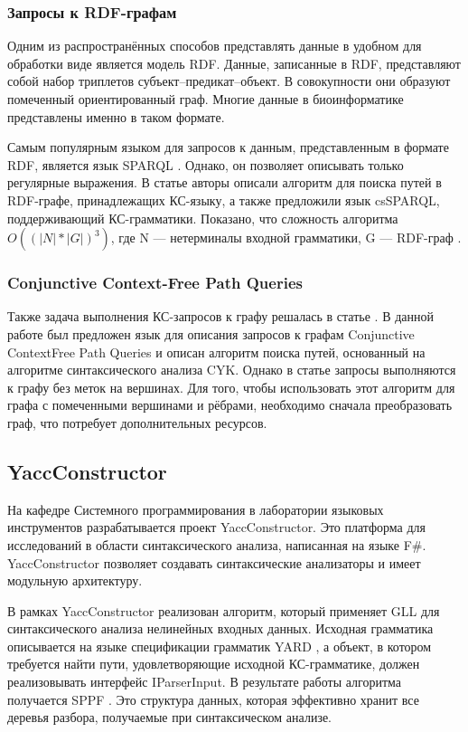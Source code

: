 \documentclass[14pt]{matmex-diploma}
\begin{document}
\subsubsection{Запросы к RDF-графам}
Одним из распространённых способов представлять данные в удобном для обработки виде является модель RDF. Данные, записанные в RDF, представляют собой набор триплетов субъект--предикат--объект. В совокупности они образуют помеченный ориентированный граф. Многие данные в биоинформатике представлены именно в таком формате.

Самым популярным языком для запросов к данным, представленным в формате RDF, является язык SPARQL \cite{prud2008sparql}. Однако, он позволяет описывать только регулярные выражения. В статье \cite{zhang2016context} авторы описали алгоритм для поиска путей в RDF-графе, принадлежащих КС-языку, а также предложили язык csSPARQL, поддерживающий КС-грамматики. Показано, что сложность алгоритма $O((|N|*|G|)^3)$, где N --- нетерминалы входной грамматики, G --- RDF-граф \cite{zhang2016context}.

\subsubsection{Conjunctive Context-Free Path Queries}
Также задача выполнения КС-запросов к графу решалась в статье \cite{hellings2014conjunctive}. В данной работе был предложен язык для описания запросов к графам Conjunctive ContextFree Path Queries и описан алгоритм поиска путей, основанный на алгоритме синтаксического анализа CYK. Однако в статье запросы выполняются к графу без меток на вершинах. Для того, чтобы использовать этот алгоритм для графа с помеченными вершинами и рёбрами, необходимо сначала преобразовать граф, что потребует дополнительных ресурсов.

\subsection{YaccConstructor}

На кафедре Системного программирования в лаборатории языковых инструментов разрабатывается проект YaccConstructor. Это платформа для исследований в области синтаксического анализа, написанная на языке F\#. YaccConstructor позволяет создавать синтаксические анализаторы и имеет модульную архитектуру.

В рамках YaccConstructor реализован алгоритм, который применяет GLL для синтаксического анализа нелинейных входных данных. Исходная грамматика описывается на языке спецификации грамматик YARD \cite{YARD}, а  объект, в котором требуется найти пути, удовлетворяющие исходной КС-грамматике, должен реализовывать интерфейс IParserInput. В результате работы алгоритма получается SPPF \cite{rekers1992parser}. Это структура данных, которая эффективно хранит все деревья разбора, получаемые при синтаксическом анализе.
\end{document}
